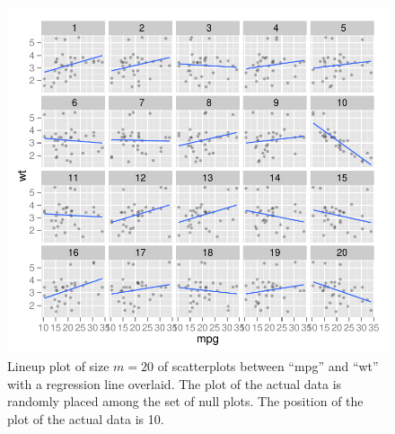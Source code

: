 \documentclass[article]{jss}
\begin{document}
\begin{figure}[hbtp]
\begin{center}
\includegraphics[scale=1.2]{nullabor-reg-ex.pdf}
\caption{Lineup plot of size $m = 20$ of scatterplots between ``mpg'' and ``wt'' with a regression line overlaid. The plot of the actual data is randomly placed among the set of null plots. The position of the plot of the actual data is 10. }
\label{lineup-reg}
\end{center}
\end{figure}

%
\end{document}
